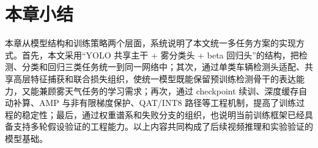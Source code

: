\section{本章小结}

本章从模型结构和训练策略两个层面，系统说明了本文统一多任务方案的实现方式。首先，本文采用“YOLO 共享主干 + 雾分类头 + beta 回归头”的结构，把检测、分类和回归三类任务统一到同一网络中；其次，通过单类车辆检测头适配、共享高层特征捕获和联合损失组织，使统一模型既能保留预训练检测骨干的表达能力，又能兼顾雾天气任务的学习需求；再次，通过 checkpoint 续训、深度缓存自动补算、AMP 与非有限梯度保护、QAT/INT8 路径等工程机制，提高了训练过程的稳定性；最后，通过权重谱系和失败分支的组织，也说明当前训练框架已经具备支持多轮假设验证的工程能力。以上内容共同构成了后续视频推理和实验验证的模型基础。
